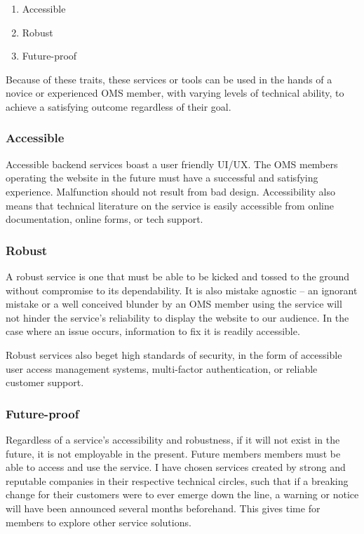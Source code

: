 \begin{enumerate}
    \item Accessible
    \item Robust
    \item Future-proof
\end{enumerate}

Because of these traits, these services or tools can be used in the hands of a novice or experienced OMS member, with varying levels of technical ability, to achieve a satisfying outcome regardless of their goal.

\subsubsection*{Accessible}
Accessible backend services boast a user friendly UI/UX\@. The OMS members operating the website in the future must have a successful and satisfying experience. Malfunction should not result from bad design. Accessibility also means that technical literature on the service is easily accessible from online documentation, online forms, or tech support.

\subsubsection*{Robust}
 A robust service is one that must be able to be kicked and tossed to the ground without compromise to its dependability. It is also mistake agnostic – an ignorant mistake or a well conceived blunder by an OMS member using the service will not hinder the service's reliability to display the website to our audience. In the case where an issue occurs, information to fix it is readily accessible.

 Robust services also beget high standards of security, in the form of accessible user access management systems, multi-factor authentication, or reliable customer support.

\subsubsection*{Future-proof}
Regardless of a service's accessibility and robustness, if it will not exist in the future, it is not employable in the present. Future members members must be able to access and use the service. I have chosen services created by strong and reputable companies in their respective technical circles, such that if a breaking change for their customers were to ever emerge down the line, a warning or notice will have been announced several months beforehand. This gives time for members to explore other service solutions.
